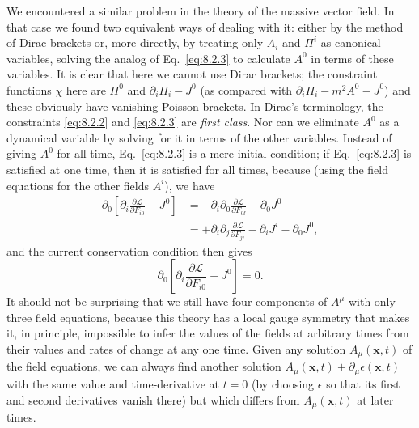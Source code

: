 We encountered a similar problem in the theory of the massive vector
field. In that case we found two equivalent ways of dealing with it:
either by the method of Dirac brackets or, more directly, by treating only
$A_i$ and $\Pi^i$ as canonical variables, solving the analog of Eq.~\eqref{eq:8.2.3} to
calculate $A^0$ in terms of these variables. It is clear that here we cannot
use Dirac brackets; the constraint functions $\chi$ here are $\Pi^0$ and
$\partial_i\Pi_i-J^0$ (as compared with $\partial_i\Pi_i-m^2A^0-J^0$) and these
obviously have vanishing Poisson brackets. In Dirac's terminology, the
constraints \eqref{eq:8.2.2} and \eqref{eq:8.2.3} are \textit{first class}. Nor can we eliminate
$A^0$ as a dynamical variable by solving for it in terms of the other variables.
Instead of giving $A^0$ for all time, Eq.~\eqref{eq:8.2.3} is a mere initial condition;
if Eq.~\eqref{eq:8.2.3} is satisfied at one time, then it is satisfied for all times,
because (using the field equations for the other fields $A^i$), we have
\begin{align*}
  \partial_0\left[\partial_i\frac{\partial\mathcal L}{\partial F_{i0}}-J^0\right]
  &=-\partial_i\partial_0\frac{\partial\mathcal L}{\partial F_{0\ii}}
  -\partial_0J^0\\
  &=+\partial_i\partial_j\frac{\partial\mathcal L}{\partial F_{ji}}
  -\partial_iJ^i-\partial_0J^0,
\end{align*}
and the current conservation condition then gives
\begin{equation}
  \partial_0\left[\partial_i\frac{\partial\mathcal L}{\partial F_{i0}}-J^0\right]=0.
  \tag{8.2.5}\label{eq:8.2.5}
\end{equation}
It should not be surprising that we still have four components of $A^\mu$
with only three field equations, because this theory has a local gauge
symmetry that makes it, in principle, impossible to infer the values of the
fields at arbitrary times from their values and rates of change at any one
time. Given any solution $A_\mu(\mathbf x,t)$ of the field equations, we can
always find another solution $A_\mu(\mathbf x,t)+\partial_\mu\epsilon(\mathbf x,t)$
with the same value and time-derivative at $t=0$ (by choosing $\epsilon$ so that
its first and second derivatives vanish there) but which differs from
$A_\mu(\mathbf x,t)$ at later times.


